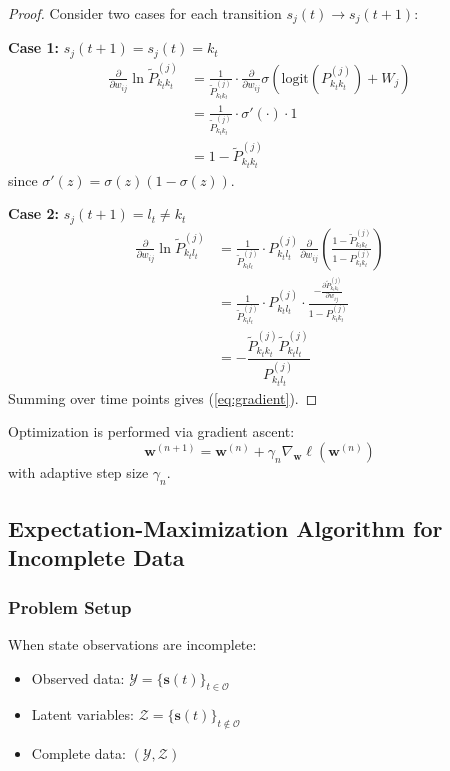 \documentclass[answers,12pt,addpoints]{exam}
\begin{document}
\begin{proof}
Consider two cases for each transition $s_j(t) \to s_j(t+1)$:

\textbf{Case 1:} $s_j(t+1) = s_j(t) = k_t$
\begin{align}
    \frac{\partial}{\partial w_{ij}} \ln \widetilde{P}^{(j)}_{k_t k_t} &= \frac{1}{\widetilde{P}^{(j)}_{k_t k_t}} \cdot \frac{\partial}{\partial w_{ij}} \sigma(\mathrm{logit}(P^{(j)}_{k_t k_t}) + W_j) \\
    &= \frac{1}{\widetilde{P}^{(j)}_{k_t k_t}} \cdot \sigma'(\cdot) \cdot 1 \\
    &= 1 - \widetilde{P}^{(j)}_{k_t k_t}
\end{align}
since $\sigma'(z) = \sigma(z)(1 - \sigma(z))$.

\textbf{Case 2:} $s_j(t+1) = l_t \neq k_t$
\begin{align}
    \frac{\partial}{\partial w_{ij}} \ln \widetilde{P}^{(j)}_{k_t l_t} &= \frac{1}{\widetilde{P}^{(j)}_{k_t l_t}} \cdot P^{(j)}_{k_t l_t} \frac{\partial}{\partial w_{ij}} \left( \frac{1 - \widetilde{P}^{(j)}_{k_t k_t}}{1 - P^{(j)}_{k_t k_t}} \right) \\
    &= \frac{1}{\widetilde{P}^{(j)}_{k_t l_t}} \cdot P^{(j)}_{k_t l_t} \cdot \frac{ - \frac{\partial \widetilde{P}^{(j)}_{k_t k_t}}{\partial w_{ij}} }{1 - P^{(j)}_{k_t k_t}} \\
    &= -\dfrac{\widetilde{P}^{(j)}_{k_t k_t} \widetilde{P}^{(j)}_{k_t l_t}}{P^{(j)}_{k_t l_t}}
\end{align}
Summing over time points gives (\ref{eq:gradient}).
\end{proof}

Optimization is performed via gradient ascent:
\begin{equation}
    \mathbf{w}^{(n+1)} = \mathbf{w}^{(n)} + \gamma_n \nabla_{\mathbf{w}} \ell(\mathbf{w}^{(n)})
\end{equation}
with adaptive step size $\gamma_n$.

\subsection{Expectation-Maximization Algorithm for Incomplete Data}

\subsubsection{Problem Setup}
When state observations are incomplete:
\begin{itemize}
    \item Observed data: $\mathscr{Y} = \{\mathbf{s}(t)\}_{t \in \mathscr{O}}$
    \item Latent variables: $\mathscr{Z} = \{\mathbf{s}(t)\}_{t \notin \mathscr{O}}$
    \item Complete data: $(\mathscr{Y}, \mathscr{Z})$
\end{itemize}
\end{document}
